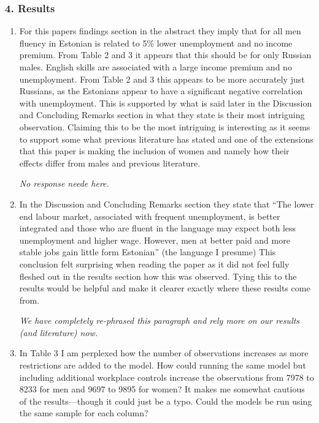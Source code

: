 \documentclass{article}
\newcommand{\debug}[1]{\marginpar{\small\raggedright\begin{spacing}{1}
      \color{BrickRed} #1
\end{spacing}
}}
\newenvironment{response}
{\slshape}{}
\begin{document}
\subsubsection*{4. Results}

\begin{enumerate}
\item For this papers findings section in the abstract they imply that
  for all men fluency in Estonian is related to 5\% lower unemployment
  and no income premium.  From Table 2 and 3 it appears that this
  should be for only Russian males. English skills are associated with
  a large income premium and no unemployment. From Table 2 and 3 this
  appears to be more accurately just Russians, as the Estonians appear
  to have a significant negative correlation with unemployment.  This
  is supported by what is said later in the Discussion and Concluding
  Remarks section in what they state is their most intriguing
  observation.  Claiming this to be the most intriguing is interesting
  as it seems to support some what previous literature has stated and
  one of the extensions that this paper is making the inclusion of
  women and namely how their effects differ from males and previous
  literature. 

  \begin{response}
    No response neede here.
  \end{response}

\item In the Discussion and Concluding Remarks section they state that
  “The lower end labour market, associated with frequent unemployment,
  is better integrated and those who are fluent in the language may
  expect both less unemployment and higher wage. However, men at
  better paid and more stable jobs gain little form Estonian” (the
  language I presume) This conclusion felt surprising when reading the
  paper as it did not feel fully fleshed out in the results section
  how this was observed. Tying this to the results would be helpful
  and make it clearer exactly where these results come from.

  \begin{response}
    We have completely re-phrased this paragraph and rely more on our
    results (and literature) now.
  \end{response}

\item In Table 3 I am perplexed how the number of observations increases as more restrictions are added to the model. How could running the same model but including additional workplace controls increase the observations from 7978 to 8233 for men and 9697 to 9895 for women? It makes me somewhat cautious of the results—though it could just be a typo. Could the models be run using the same sample for each column?
\debug{These typos got fixed.}
\end{enumerate}
\end{document}
